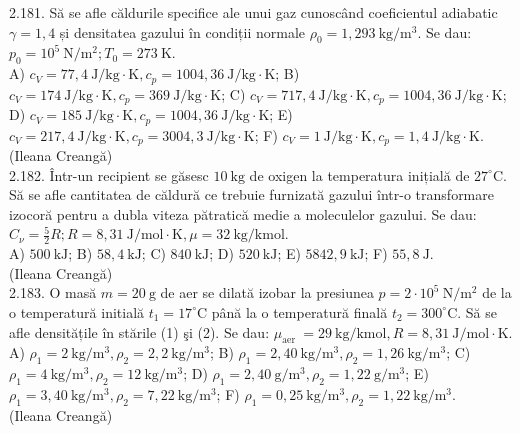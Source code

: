 \documentclass[10pt]{article}
\begin{document}
2.181. Să se afle căldurile specifice ale unui gaz cunoscând coeficientul adiabatic $\gamma=1,4$ și densitatea gazului în condiții normale $\rho_{0}=1,293 \mathrm{~kg} / \mathrm{m}^{3}$. Se dau: $p_{0}=10^{5} \mathrm{~N} / \mathrm{m}^{2} ; T_{0}=273 \mathrm{~K}$.\\ A) $c_{V}=77,4 \mathrm{~J} / \mathrm{kg} \cdot \mathrm{K} , c_{p}=1004,36 \mathrm{~J} / \mathrm{kg} \cdot \mathrm{K}$; B) $c_{V}=174 \mathrm{~J} / \mathrm{kg} \cdot \mathrm{K} , c_{p}=369 \mathrm{~J} / \mathrm{kg} \cdot \mathrm{K}$; C) $c_{V}=717,4 \mathrm{~J} / \mathrm{kg} \cdot \mathrm{K} , c_{p}=1004,36 \mathrm{~J} / \mathrm{kg} \cdot \mathrm{K}$; D) $c_{V}=185 \mathrm{~J} / \mathrm{kg} \cdot \mathrm{K} , c_{p}=1004,36 \mathrm{~J} / \mathrm{kg} \cdot \mathrm{K}$; E) $c_{V}=217,4 \mathrm{~J} / \mathrm{kg} \cdot \mathrm{K} , c_{p}=3004,3 \mathrm{~J} / \mathrm{kg} \cdot \mathrm{K}$; F) $c_{V}=1 \mathrm{~J} / \mathrm{kg} \cdot \mathrm{K} , c_{p}=1,4 \mathrm{~J} / \mathrm{kg} \cdot \mathrm{K}$.\\ (Ileana Creangă)\\

2.182. Într-un recipient se găsesc $10 \mathrm{~kg}$ de oxigen la temperatura inițială de $27^{\circ} \mathrm{C}$. Să se afle cantitatea de căldură ce trebuie furnizată gazului într-o transformare izocoră pentru a dubla viteza pătratică medie a moleculelor gazului. Se dau: $C_{\nu}=\frac{5}{2} R ; R=8,31 \mathrm{~J} / \mathrm{mol} \cdot \mathrm{K}, \mu=32 \mathrm{~kg} / \mathrm{kmol}$.\\ A) $500 \mathrm{~kJ}$; B) $58,4 \mathrm{~kJ}$; C) $840 \mathrm{~kJ}$; D) $520 \mathrm{~kJ}$; E) $5842,9 \mathrm{~kJ}$; F) $55,8 \mathrm{~J}$.\\ (Ileana Creangă)\\

2.183. O masă $m=20 \mathrm{~g}$ de aer se dilată izobar la presiunea $p=2 \cdot 10^{5} \mathrm{~N} / \mathrm{m}^{2}$ de la o temperatură initială $t_{1}=17^{\circ} \mathrm{C}$ până la o temperatură finală $t_{2}=300^{\circ} \mathrm{C}$. Să se afle densitățile în stările (1) şi (2). Se dau: $\mu_{\text {aer }}=29 \mathrm{~kg} / \mathrm{kmol}, R=8,31 \mathrm{~J} / \mathrm{mol} \cdot \mathrm{K}$.\\ A) $\rho_{1}=2 \mathrm{~kg} / \mathrm{m}^{3}, \rho_{2}=2,2 \mathrm{~kg} / \mathrm{m}^{3}$; B) $\rho_{1}=2,40 \mathrm{~kg} / \mathrm{m}^{3}, \rho_{2}=1,26 \mathrm{~kg} / \mathrm{m}^{3}$; C) $\rho_{1}=4 \mathrm{~kg} / \mathrm{m}^{3}, \rho_{2}=12 \mathrm{~kg} / \mathrm{m}^{3}$; D) $\rho_{1}=2,40 \mathrm{~g} / \mathrm{m}^{3}, \rho_{2}=1,22 \mathrm{~g} / \mathrm{m}^{3}$; E) $\rho_{1}=3,40 \mathrm{~kg} / \mathrm{m}^{3}, \rho_{2}=7,22 \mathrm{~kg} / \mathrm{m}^{3}$; F) $\rho_{1}=0,25 \mathrm{~kg} / \mathrm{m}^{3}, \rho_{2}=1,22 \mathrm{~kg} / \mathrm{m}^{3}$.\\ (Ileana Creangă)\\
\end{document}
